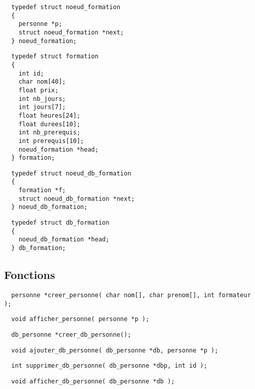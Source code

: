 \documentclass[11pt]{article}
\begin{document}
\begin{lstlisting}
  typedef struct noeud_formation
  {
    personne *p;
    struct noeud_formation *next;
  } noeud_formation;
\end{lstlisting}

\begin{lstlisting}
  typedef struct formation
  {
    int id;
    char nom[40];
    float prix;
    int nb_jours;
    int jours[7];
    float heures[24];
    float durees[10];
    int nb_prerequis;
    int prerequis[10];
    noeud_formation *head;
  } formation;
\end{lstlisting}

\begin{lstlisting}
  typedef struct noeud_db_formation
  {
    formation *f;
    struct noeud_db_formation *next;
  } noeud_db_formation;
\end{lstlisting}

\begin{lstlisting}
  typedef struct db_formation
  {
    noeud_db_formation *head;
  } db_formation;
\end{lstlisting}

\newpage
\subsection{Fonctions}

\begin{lstlisting}
  personne *creer_personne( char nom[], char prenom[], int formateur );
\end{lstlisting}

\begin{lstlisting}
  void afficher_personne( personne *p );
\end{lstlisting}

\begin{lstlisting}
  db_personne *creer_db_personne();
\end{lstlisting}

\begin{lstlisting}
  void ajouter_db_personne( db_personne *db, personne *p );
\end{lstlisting}

\begin{lstlisting}
  int supprimer_db_personne( db_personne *dbp, int id );
\end{lstlisting}

\begin{lstlisting}
  void afficher_db_personne( db_personne *db );
\end{lstlisting}
\end{document}
